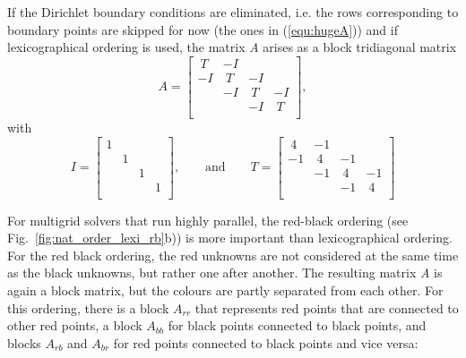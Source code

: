 If the Dirichlet boundary conditions are eliminated, i.e. the rows corresponding to boundary points are skipped for now (the ones in (\ref{equ:hugeA})) and if lexicographical ordering is used, the matrix \textit{A} arises as a block tridiagonal matrix
\begin{equation}
A = \begin{bmatrix}
~T & -I  & &\\
-I & ~T & -I & \\
& -I & ~T & -I \\
& & -I & ~T\\
\end{bmatrix},
\end{equation}
with 
\begin{equation}
I = \begin{bmatrix}
1& & &  \\
&1 & & \\
& & 1 & \\
& & & 1 \\
\end{bmatrix}, \textrm{~~~~~~and~~~~~~} T = 
\begin{bmatrix}
~4 & -1& &  \\
-1&~4 & -1& \\
& -1& ~4 & -1 \\
& &-1 & ~4 \\
\end{bmatrix}
\end{equation}

For multigrid solvers that run highly parallel, the red-black ordering (see Fig.~\ref{fig:nat_order_lexi_rb}b)) is more important than lexicographical ordering. For the red black ordering, the red unknowns are not considered at the same time as the black unknowns, but rather one after another. The resulting matrix \textit{A} is again a block matrix, but the colours are partly separated from each other. For this ordering, there is a block $A_{rr}$ that represents red points that are connected to other red points, a block $A_{bb}$ for black points connected to black points, and blocks $A_{rb}$ and $A_{br}$ for red points connected to black points and vice versa: 

